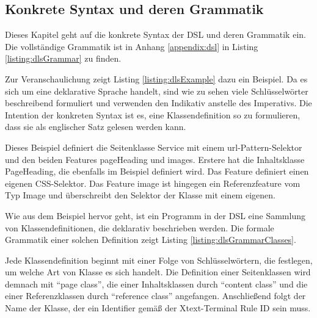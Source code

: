 \subsection{Konkrete Syntax und deren Grammatik}
    Dieses Kapitel geht auf die konkrete Syntax der DSL
    und deren Grammatik ein.
    Die vollständige Grammatik ist in Anhang \ref{appendix:dsl}
    in Listing \ref{listing:dlsGrammar} zu finden.
    
    Zur Veranschaulichung zeigt Listing \ref{listing:dlsExample} dazu ein Beispiel.
    Da es sich um eine deklarative Sprache handelt,
    sind wie zu sehen viele Schlüsselwörter beschreibend formuliert und verwenden
    den Indikativ anstelle des Imperativs.
    Die Intention der konkreten Syntax ist es, eine Klassendefinition
    so zu formulieren, dass sie als englischer Satz gelesen werden kann.

    
    
    Dieses Beispiel definiert die Seitenklasse Service mit einem \gls{url}-Pattern-Selektor
    und den beiden Features pageHeading und images.
    Erstere hat die Inhaltsklasse PageHeading, die ebenfalls im Beispiel definiert wird.
    Das Feature definiert einen eigenen CSS-Selektor.
    Das Feature image ist hingegen ein Referenzfeature vom Typ Image und überschreibt
    den Selektor der Klasse mit einem eigenen.

    Wie aus dem Beispiel hervor geht, ist ein Programm in der DSL eine Sammlung
    von Klassendefinitionen, die deklarativ beschrieben werden.
    Die formale Grammatik einer solchen Definition zeigt Listing \ref{listing:dlsGrammarClasses}.

    

    Jede Klassendefinition beginnt mit einer Folge von Schlüsselwörtern,
    die festlegen, um welche Art von Klasse es sich handelt.
    Die Definition einer Seitenklassen wird demnach mit "`page class"',
    die einer Inhaltsklassen durch "`content class"' und die einer
    Referenzklassen durch "`reference class"' angefangen.
    Anschließend folgt der Name der Klasse, der ein Identifier gemäß
    der Xtext-Terminal Rule ID sein muss.


